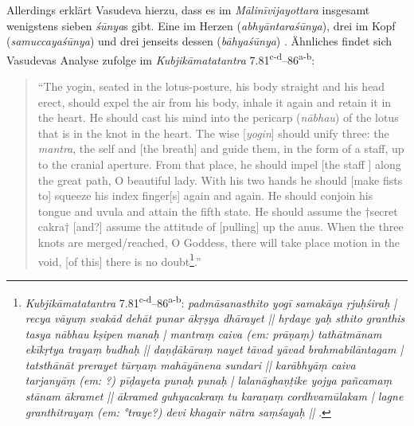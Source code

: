 \documentclass[a4paper,12pt]{article}
\begin{document}
        Allerdings erklärt Vasudeva hierzu, dass es im \textit{Mālinīvijayottara} insgesamt wenigstens sieben \textit{śūnya}s gibt. Eine im Herzen (\textit{abhyāntaraśūnya}), drei im Kopf (\textit{samuccayaśūnya}) und drei jenseits dessen (\textit{bāhyaśūnya}) \parencite[266]{vasudeva2004}. Ähnliches findet sich Vasudevas Analyse zufolge im \textit{Kubjikāmatatantra} 7.81\textsuperscript{c-d}–86\textsuperscript{a-b}: \begin{quote} ``The yogin, seated in the lotus-posture, his body straight and his head erect, should expel the air from his body, inhale it again and retain it in the heart. He should cast his mind into the pericarp (\textit{nābhau}) of the lotus that is in the knot in the heart. The wise [\textit{yogin}] should unify three: the \textit{mantra}, the self and [the breath] and guide them, in the form of a staff, up to the cranial aperture. From that place, he should impel [the staff ] along the great path, O beautiful lady. With his two hands he should [make fists to] squeeze his index finger[s] again and again. He should conjoin his tongue and uvula and attain the fifth state. He should assume the †secret cakra† [and?] assume the attitude of [pulling] up the anus. When the three knots are merged/reached, O Goddess, there will take place motion in the void, [of this] there is no doubt\footnote{\textit{Kubjikāmatatantra} 7.81\textsuperscript{c-d}–86\textsuperscript{a-b}: \textit{padmāsanasthito yogī samakāya ṛjuḥśiraḥ | recya vāyuṃ svakād dehāt punar ākṛṣya dhārayet || hṛdaye yaḥ sthito granthis tasya nābhau kṣipen manaḥ | mantraṃ caiva (em: prāṇaṃ) tathātmānam ekīkṛtya trayaṃ budhaḥ || daṇḍākāraṃ nayet tāvad yāvad brahmabilāntagam | tatsthānāt prerayet tūrṇaṃ mahāyānena sundari || karābhyāṃ caiva tarjanyāṃ (em: ?) pīḍayeta punaḥ punaḥ | lalanāghaṇṭike yojya pañcamaṃ stānam ākramet || ākramed guhyacakraṃ tu karaṇaṃ cordhvamūlakam | lagne granthitrayaṃ (em: °traye?) devi khagair nātra saṃśayaḥ ||} \parencite[266]{vasudeva2004}.}.'' \parencite[267]{vasudeva2004}\end{quote}
\end{document}
